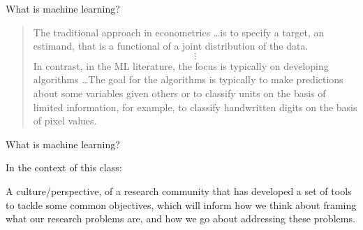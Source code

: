 \documentclass[xcolor={dvipsnames},handout]{beamer}
\begin{document}



\begin{frame}{What is machine learning?}

\begin{quote}
The traditional approach in econometrics \dots is to specify a target, an estimand, that is a functional of a joint distribution of the data.
$$
\vdots
$$
In contrast, in the ML literature, the focus is typically on developing algorithms \dots The goal for the algorithms is typically to make predictions about some variables given others or to classify units on the basis of limited information, for example, to classify handwritten digits on the basis of pixel values.
\end{quote}

\hfill \cite{athey2019machine}

\end{frame}





\begin{frame}{What is machine learning?}

In the context of this class:\pause

\begin{wideitemize}
\item A culture/perspective, \pause of a research community that has developed a set of tools to tackle some common objectives, \pause which will inform how we think about framing what our research problems are, and how we go about addressing these problems. 
\end{wideitemize}

\end{frame}


\end{document}
